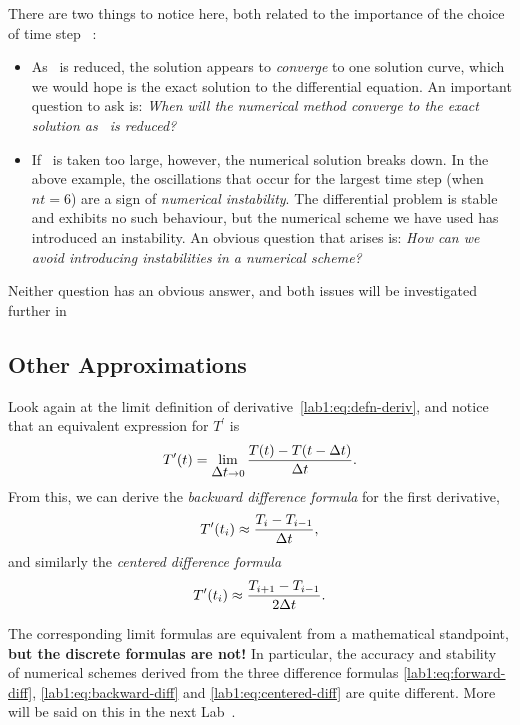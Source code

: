 \begin{example}
  There are two things to notice here, both related to the importance of
  the choice of time step \dt\ :
  \begin{itemize}
  \item As \dt\ is reduced, the solution appears to \emph{converge}
    to one solution curve, which we would hope is the exact solution
    to the differential equation.  An important question to ask is:
    \emph{When will the numerical method converge to the exact
      solution as \dt\ is reduced?}   
  \item If \dt\ is taken too large, however, the numerical solution
    breaks down.  In the above example, the oscillations that occur
    for the largest time step (when $nt=6$) are a sign of {\em
      numerical instability}.  The differential problem is stable
    and exhibits no such behaviour, but the numerical scheme we have
    used has introduced an instability.
    An obvious question that arises is: \emph{How can we avoid
      introducing instabilities in a numerical scheme?}
  \end{itemize}
  Neither question has an obvious answer, and both issues will be
  investigated further in 
\end{example}

\subsection{Other Approximations}

Look again at the limit definition of
derivative~\eqref{lab1:eq:defn-deriv}, and notice that an equivalent
expression for $T^\prime$ is 
\begin{equation}
  T^\prime(t) = \lim_{\mbox{$\Delta t$}{}\rightarrow 0} \frac{T(t)-T(t-\mbox{$\Delta t$}{})}{\mbox{$\Delta t$}{}}.
  \label{lab1:eq:defn-back}
\end{equation}
From this, we can derive the \emph{backward difference formula} for the
first derivative, 
\begin{equation}
  T^\prime(t_i) \approx \frac{T_i-T_{i-1}}{\mbox{$\Delta t$}{}},
  \label{lab1:eq:backward-diff}
\end{equation}
and similarly the \emph{centered difference formula}
\begin{equation}
  T^\prime(t_i) \approx \frac{T_{i+1}-T_{i-1}}{2 \mbox{$\Delta t$}{}}.
  \label{lab1:eq:centered-diff}
\end{equation}

The corresponding limit formulas are equivalent from a mathematical
standpoint, {\bf but the discrete formulas are not!}  
In particular, the accuracy and stability of numerical schemes derived
from the three difference formulas \eqref{lab1:eq:forward-diff},
\eqref{lab1:eq:backward-diff} and \eqref{lab1:eq:centered-diff} are
quite different.
More will be said on this in the next
Lab~. 

